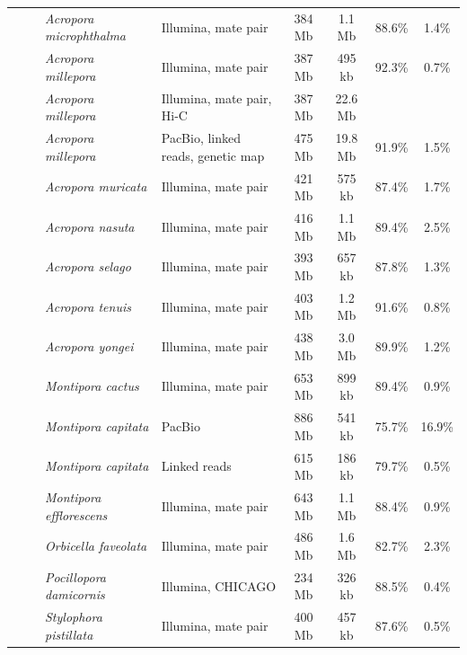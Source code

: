 \begin{table}
{\begin{tabular}{llllcccc}
    & & \textit{Acropora microphthalma} \cite{acropora_digitifera2} & Illumina, mate pair & 384 Mb & 1.1 Mb & 88.6\% & 1.4\% \\
    & & \textit{Acropora millepora} \cite{acropora_millepora1} & Illumina, mate pair & 387 Mb & 495 kb & 92.3\% & 0.7\% \\
    & & \textit{Acropora millepora \cite{hic_genomes}} & Illumina, mate pair, Hi-C & 387 Mb & 22.6 Mb &  &  \\
    & & \textit{Acropora millepora} \cite{acropora_millepora2} & PacBio, linked reads, genetic map & 475 Mb & 19.8 Mb & 91.9\% & 1.5\% \\
    & & \textit{Acropora muricata} \cite{acropora_digitifera2} & Illumina, mate pair & 421 Mb & 575 kb & 87.4\% & 1.7\% \\
    & & \textit{Acropora nasuta} \cite{acropora_digitifera2} & Illumina, mate pair & 416 Mb & 1.1 Mb & 89.4\% & 2.5\% \\
    & & \textit{Acropora selago} \cite{acropora_digitifera2} & Illumina, mate pair & 393 Mb & 657 kb & 87.8\% & 1.3\% \\
    & & \textit{Acropora tenuis} \cite{acropora_digitifera2} & Illumina, mate pair & 403 Mb & 1.2 Mb & 91.6\% & 0.8\% \\
    & & \textit{Acropora yongei} \cite{acropora_digitifera2} & Illumina, mate pair & 438 Mb & 3.0 Mb & 89.9\% & 1.2\% \\\
    & & \textit{Montipora cactus} \cite{acropora_digitifera2} & Illumina, mate pair & 653 Mb & 899 kb & 89.4\% & 0.9\% \\
    & & \textit{Montipora capitata} \cite{montipora_capitata1} & PacBio & 886 Mb & 541 kb & 75.7\% & 16.9\% \\
    & & \textit{Montipora capitata} \cite{montipora_capitata2} & Linked reads & 615 Mb & 186 kb & 79.7\% & 0.5\% \\
    & & \textit{Montipora efflorescens} \cite{acropora_digitifera2} & Illumina, mate pair & 643 Mb & 1.1 Mb & 88.4\% & 0.9\% \\
    & & \textit{Orbicella faveolata} \cite{orbicella_faveolata} & Illumina, mate pair & 486 Mb & 1.6 Mb & 82.7\% & 2.3\% \\
    & & \textit{Pocillopora damicornis} \cite{pocillopora_damicornis} & Illumina, CHICAGO & 234 Mb & 326 kb & 88.5\% & 0.4\% \\
    & & \textit{Stylophora pistillata} \cite{stylophora_pistillata} & Illumina, mate pair & 400 Mb & 457 kb & 87.6\% & 0.5\% \\

\end{tabular}}
\end{table}
